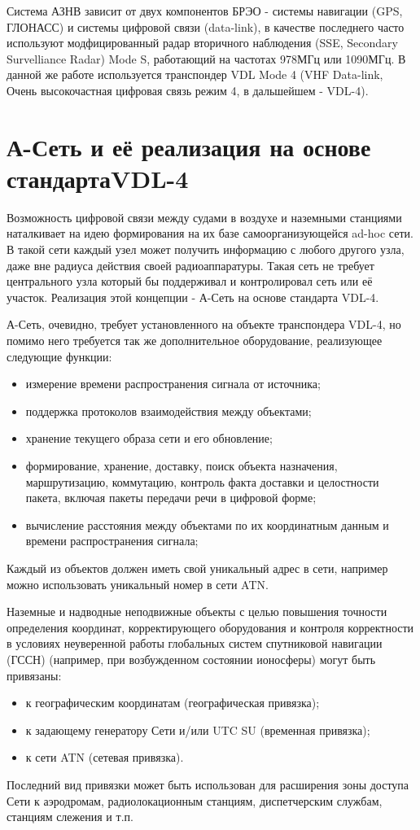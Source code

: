 \documentclass[a4paper,12pt]{report} %
\begin{document}
Система АЗНВ зависит от двух компонентов БРЭО - системы навигации (GPS, ГЛОНАСС)
и системы цифровой связи (data-link), в качестве последнего часто используют
модфицированный радар вторичного наблюдения (SSE, Secondary Survelliance Radar)
Mode S, работающий на частотах 978МГц или 1090МГц. В данной же работе
используется транспондер VDL Mode 4 (VHF Data-link, Очень высокочастная цифровая
связь режим 4, в дальшейшем - VDL-4).
\newpage
\section{А-Сеть и её реализация на основе стандарта\newline VDL-4} %

Возможность цифровой связи между судами в воздухе и наземными станциями
наталкивает на идею формирования на их базе самоорганизующейся ad-hoc сети. В
такой сети каждый узел может получить информацию с любого другого узла, даже вне
радиуса действия своей радиоаппаратуры. Такая сеть не требует центрального узла
который бы поддерживал и контролировал сеть или её участок. Реализация этой
концепции - А-Сеть на основе стандарта VDL-4.

А-Сеть, очевидно, требует установленного на объекте транспондера VDL-4, но
помимо него требуется так же дополнительное оборудование, реализующее следующие
функции:
\begin{itemize}
\item измерение времени распространения сигнала от источника;
\item поддержка протоколов взаимодействия между объектами;
\item хранение текущего образа сети и его обновление;
\item формирование, хранение, доставку, поиск объекта назначения, маршрутизацию,
 коммутацию, контроль факта доставки и целостности пакета, включая пакеты
 передачи речи в цифровой форме;
\item вычисление расстояния между объектами по их координатным данным и времени
  распространения сигнала;
\end{itemize}

Каждый из объектов должен иметь свой уникальный адрес в сети, например можно
использовать уникальный номер в сети ATN.

Наземные и надводные неподвижные объекты с целью повышения точности определения
координат, корректирующего оборудования и контроля корректности в условиях
неуверенной работы глобальных систем спутниковой навигации (ГССН) (например, при
возбужденном состоянии ионосферы) могут быть привязаны:
\begin{itemize}
\item к географическим координатам (географическая привязка);
\item к задающему генератору Сети и/или UTC SU (временная привязка);
\item к сети ATN (сетевая привязка).
\end{itemize}
Последний вид привязки может быть использован для расширения зоны доступа
Сети к аэродромам, радиолокационным станциям, диспетчерским службам, станциям
слежения и т.п.
\end{document}
